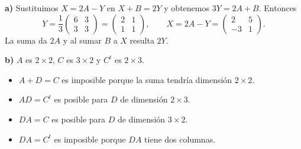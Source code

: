 \textbf{a)} Sustituimos $X=2A-Y$ en $X+B=2Y$ y obtenemos
$3Y=2A+B$. Entonces
\[
Y=\frac13\begin{pmatrix}6&3\\3&3\end{pmatrix}
=\boxed{\begin{pmatrix}2&1\\1&1\end{pmatrix}},\qquad
X=2A-Y=\boxed{\begin{pmatrix}2&5\\-3&1\end{pmatrix}}.
\]
La suma da $2A$ y al sumar $B$ a $X$ resulta $2Y$.

\textbf{b)} $A$ es $2\times2$, $C$ es $3\times2$ y
$C^t$ es $2\times3$.
\begin{itemize}
\item $A+D=C$ es imposible porque la suma tendría dimensión $2\times2$.
\item $AD=C^t$ es posible para $D$ de dimensión $2\times3$.
\item $DA=C$ es posible para $D$ de dimensión $3\times2$.
\item $DA=C^t$ es imposible porque $DA$ tiene dos columnas.
\end{itemize}
